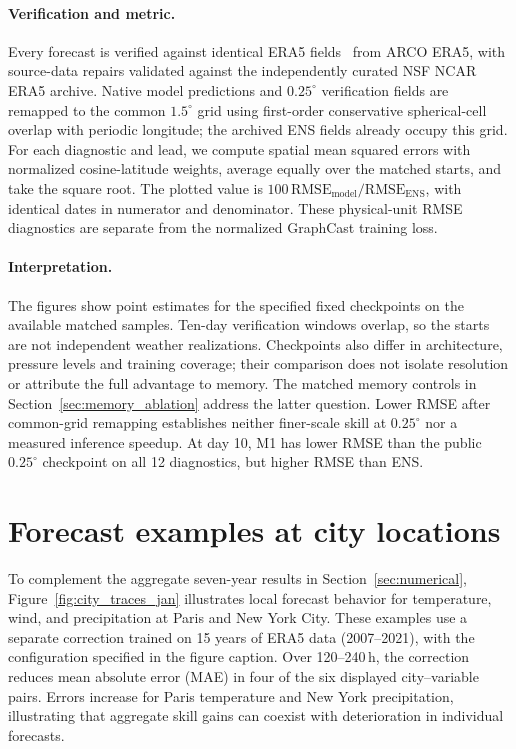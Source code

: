 \documentclass[11pt]{article}
\begin{document}
\paragraph{Verification and metric.}
Every forecast is verified against identical ERA5 fields~\citep{hersbach2020era5} from ARCO ERA5, with source-data repairs validated against the independently curated NSF NCAR ERA5 archive. Native model predictions and $0.25^\circ$ verification fields are remapped to the common $1.5^\circ$ grid using first-order conservative spherical-cell overlap with periodic longitude; the archived ENS fields already occupy this grid. For each diagnostic and lead, we compute spatial mean squared errors with normalized cosine-latitude weights, average equally over the matched starts, and take the square root. The plotted value is $100\,\mathrm{RMSE}_{\mathrm{model}}/\mathrm{RMSE}_{\mathrm{ENS}}$, with identical dates in numerator and denominator. These physical-unit RMSE diagnostics are separate from the normalized GraphCast training loss.

\paragraph{Interpretation.}
The figures show point estimates for the specified fixed checkpoints on the available matched samples. Ten-day verification windows overlap, so the starts are not independent weather realizations. Checkpoints also differ in architecture, pressure levels and training coverage; their comparison does not isolate resolution or attribute the full advantage to memory. The matched memory controls in Section~\ref{sec:memory_ablation} address the latter question. Lower RMSE after common-grid remapping establishes neither finer-scale skill at $0.25^\circ$ nor a measured inference speedup. At day 10, M1 has lower RMSE than the public $0.25^\circ$ checkpoint on all 12 diagnostics, but higher RMSE than ENS.

\clearpage
\section{Forecast examples at city locations}
\label{app:city_traces}
To complement the aggregate seven-year results in Section~\ref{sec:numerical}, Figure~\ref{fig:city_traces_jan} illustrates local forecast behavior for temperature, wind, and precipitation at Paris and New York City. These examples use a separate correction trained on 15 years of ERA5 data (2007--2021), with the configuration specified in the figure caption. Over 120--240\,h, the correction reduces mean absolute error (MAE) in four of the six displayed city--variable pairs. Errors increase for Paris temperature and New York precipitation, illustrating that aggregate skill gains can coexist with deterioration in individual forecasts.
\end{document}
